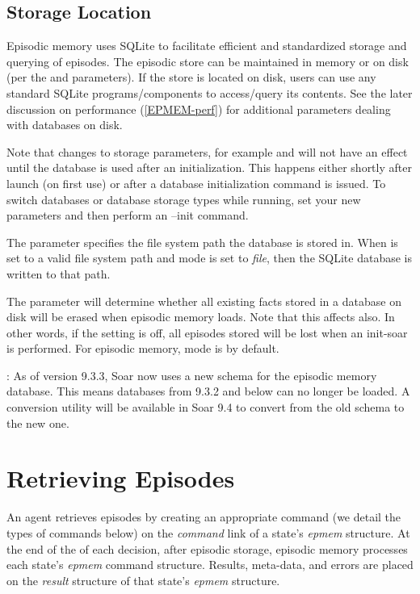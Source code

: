 \subsection{Storage Location}
Episodic memory uses SQLite to facilitate efficient and standardized storage and querying of episodes.  
The episodic store can be maintained in memory or on disk (per the  and  parameters).  
If the store is located on disk, users can use any standard SQLite programs/components to access/query its contents. 
See the later discussion on performance (\ref{EPMEM-perf}) for additional parameters dealing with databases on disk.

Note that changes to storage parameters, for example  and  will not have an effect until the database is used after an initialization. This happens either shortly after launch (on first use) or after a database initialization command is issued. To switch databases or database storage types while running, set your new parameters and then perform an --init command.

The  parameter specifies the file system path the database is stored in. When  is set to a valid file system path and  mode is set to \emph{file}, then the SQLite database is written to that path.

The  parameter will determine whether all existing facts stored in a database on disk will be erased when episodic memory loads. Note that this affects  also.  In other words, if the  setting is off, all episodes stored will be lost when an init-soar is performed. For episodic memory,  mode is  by default.

: As of version 9.3.3, Soar now uses a new schema for the episodic memory database. This means databases from 9.3.2 and below can no longer be loaded.  A conversion utility will be available in Soar 9.4 to convert from the old schema to the new one.

\section{Retrieving Episodes}
\label{EPMEM-retrieval}

An agent retrieves episodes by creating an appropriate command (we detail the types of commands below) on the \emph{command} link of a state's \emph{epmem} structure. 
At the end of the  of each decision, after episodic storage, episodic memory processes each state's \emph{epmem} command structure.  
Results, meta-data, and errors are placed on the \emph{result} structure of that state's \emph{epmem} structure.

